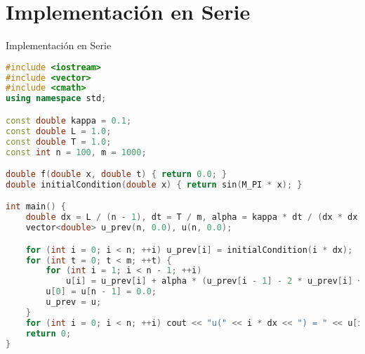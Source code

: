 \documentclass{beamer}
\begin{document}
\section{Implementación en Serie}
\begin{frame}[fragile]{Implementación en Serie}
\begin{lstlisting}[language=C++, caption=Código en C++ para la implementación en serie]
#include <iostream>
#include <vector>
#include <cmath>
using namespace std;

const double kappa = 0.1;
const double L = 1.0;
const double T = 1.0;
const int n = 100, m = 1000;

double f(double x, double t) { return 0.0; }
double initialCondition(double x) { return sin(M_PI * x); }

int main() {
    double dx = L / (n - 1), dt = T / m, alpha = kappa * dt / (dx * dx);
    vector<double> u_prev(n, 0.0), u(n, 0.0);

    for (int i = 0; i < n; ++i) u_prev[i] = initialCondition(i * dx);
    for (int t = 0; t < m; ++t) {
        for (int i = 1; i < n - 1; ++i)
            u[i] = u_prev[i] + alpha * (u_prev[i - 1] - 2 * u_prev[i] + u_prev[i + 1]) + dt * f(i * dx, t * dt);
        u[0] = u[n - 1] = 0.0;
        u_prev = u;
    }
    for (int i = 0; i < n; ++i) cout << "u(" << i * dx << ") = " << u[i] << endl;
    return 0;
}
\end{lstlisting}
\end{frame}
\end{document}
